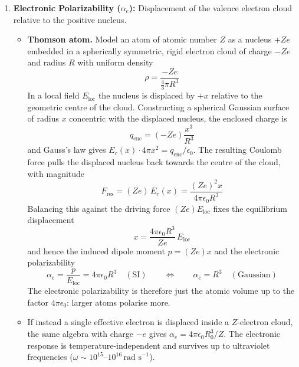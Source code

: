 \documentclass[11pt,a4paper]{article}
\begin{document}
\begin{enumerate}
    \item \textbf{Electronic Polarizability ($\alpha_e$):}
    Displacement of the valence electron cloud relative to the positive nucleus.
    \begin{itemize}
        \item \textbf{Thomson atom.} Model an atom of atomic number $Z$ as a nucleus $+Ze$ embedded in a spherically symmetric, rigid electron cloud of charge $-Ze$ and radius $R$ with uniform density
        \begin{equation}
            \rho = \frac{-Ze}{\frac{4}{3}\pi R^3}
        \end{equation}
        In a local field $E_{\text{loc}}$ the nucleus is displaced by $+x$ relative to the geometric centre of the cloud. Constructing a spherical Gaussian surface of radius $x$ concentric with the displaced nucleus, the enclosed charge is
        \begin{equation}
            q_{\text{enc}} = (-Ze)\frac{x^3}{R^3}
        \end{equation}
        and Gauss's law gives $E_r(x)\cdot 4\pi x^2 = q_{\text{enc}}/\epsilon_0$. The resulting Coulomb force pulls the displaced nucleus back towards the centre of the cloud, with magnitude
        \begin{equation}
            F_{\text{res}} = (Ze)\,E_r(x) = \frac{(Ze)^2 x}{4\pi\epsilon_0 R^3}
        \end{equation}
        Balancing this against the driving force $(Ze)E_{\text{loc}}$ fixes the equilibrium displacement
        \begin{equation}
            x = \frac{4\pi\epsilon_0 R^3}{Ze}\,E_{\text{loc}}
        \end{equation}
        and hence the induced dipole moment $p = (Ze)x$ and the electronic polarizability
        \begin{equation}
            \alpha_e = \frac{p}{E_{\text{loc}}} = 4\pi\epsilon_0 R^3 \quad (\mathrm{SI}) \qquad \Longleftrightarrow \qquad \alpha_e = R^3 \quad (\mathrm{Gaussian})
        \end{equation}
        The electronic polarizability is therefore just the atomic volume up to the factor $4\pi\epsilon_0$: larger atoms polarise more.
        \item If instead a single effective electron is displaced inside a $Z$-electron cloud, the same algebra with charge $-e$ gives $\alpha_e = 4\pi\epsilon_0 R_0^3/Z$. The electronic response is temperature-independent and survives up to ultraviolet frequencies ($\omega \sim 10^{15}$--$10^{16}\,\text{rad s}^{-1}$).
    \end{itemize}


\end{enumerate}
\end{document}
